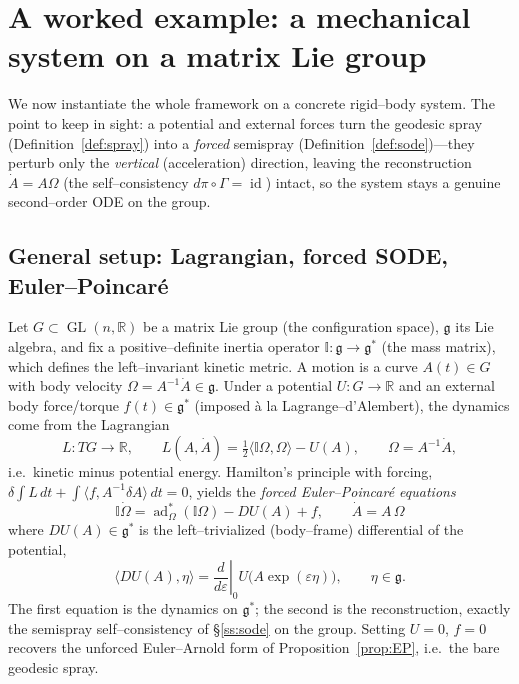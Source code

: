 \documentclass[11pt]{article}
\theoremstyle{definition}
\theoremstyle{plain}
\newcommand{\g}{\mathfrak{g}}
\newcommand{\ad}{\operatorname{ad}}
\newcommand{\id}{\operatorname{id}}
\newcommand{\dpi}{d\pi}
\newcommand{\inner}[2]{\langle #1, #2\rangle}
\newcommand{\TG}{TG}
\newcommand{\Inertia}{\mathbb{I}}
\DeclareMathOperator{\GL}{GL}
\begin{document}
\section{A worked example: a mechanical system on a matrix Lie group}
\label{sec:example}

We now instantiate the whole framework on a concrete rigid--body system. The point to keep
in sight: a potential and external forces turn the geodesic spray
(Definition~\ref{def:spray}) into a \emph{forced} semispray
(Definition~\ref{def:sode})---they perturb only the \emph{vertical} (acceleration)
direction, leaving the reconstruction $\dot A=A\Omega$ (the self--consistency
$\dpi\circ\Gamma=\id$) intact, so the system stays a genuine second--order ODE on the group.

\subsection{General setup: Lagrangian, forced SODE, Euler--Poincar\'e}
\label{ss:ex-general}

Let $G\subset\GL(n,\mathbb{R})$ be a matrix Lie group (the configuration space), $\g$ its
Lie algebra, and fix a positive--definite inertia operator $\Inertia:\g\to\g^{*}$ (the mass
matrix), which defines the left--invariant kinetic metric. A motion is a curve $A(t)\in G$
with body velocity $\Omega=A^{-1}\dot A\in\g$. Under a potential $U:G\to\mathbb{R}$ and an
external body force/torque $f(t)\in\g^{*}$ (imposed \`a la Lagrange--d'Alembert), the
dynamics come from the Lagrangian
\begin{equation}\label{eq:ex-lagrangian}
  L:\TG\to\mathbb{R},\qquad
  L(A,\dot A)=\tfrac12\inner{\Inertia\Omega}{\Omega}-U(A),
  \qquad \Omega=A^{-1}\dot A ,
\end{equation}
i.e.\ kinetic minus potential energy. Hamilton's principle with forcing,
$\delta\!\int L\,dt+\int\inner{f}{A^{-1}\delta A}\,dt=0$, yields the \emph{forced
Euler--Poincar\'e equations}
\begin{equation}\label{eq:ex-EP}
  \boxed{\;\Inertia\dot\Omega=\ad^{*}_{\Omega}(\Inertia\Omega)-DU(A)+f,
  \qquad \dot A=A\,\Omega\;}
\end{equation}
where $DU(A)\in\g^{*}$ is the left--trivialized (body--frame) differential of the potential,
\begin{equation}\label{eq:ex-DU}
  \inner{DU(A)}{\eta}=\left.\frac{d}{d\varepsilon}\right|_{0}U\!\bigl(A\exp(\varepsilon\eta)\bigr),
  \qquad \eta\in\g .
\end{equation}
The first equation is the dynamics on $\g^{*}$; the second is the reconstruction, exactly
the semispray self--consistency of \S\ref{ss:sode} on the group. Setting $U=0$, $f=0$
recovers the unforced Euler--Arnold form of Proposition~\ref{prop:EP}, i.e.\ the bare
geodesic spray.
\end{document}
